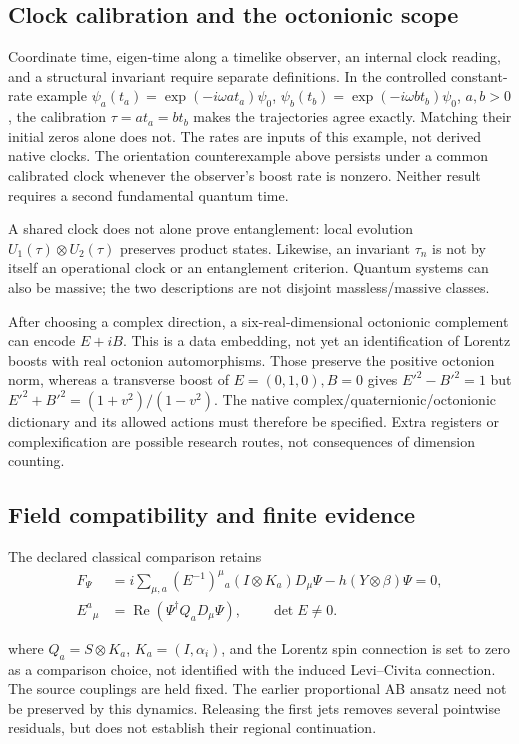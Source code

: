 \subsection{Clock calibration and the octonionic scope}
\label{subsec:v410-clock-scope}

Coordinate time, eigen-time along a timelike observer, an internal clock
reading, and a structural invariant require separate definitions. In the
controlled constant-rate example
\(\psi_a(t_a)=\exp(-i\omega a t_a)\psi_0\),
\(\psi_b(t_b)=\exp(-i\omega b t_b)\psi_0\), \(a,b>0\), the calibration
\(\tau=a t_a=b t_b\) makes the trajectories agree exactly. Matching
their initial zeros alone does not. The rates are inputs of this example,
not derived native clocks. The orientation counterexample above persists
under a common calibrated clock whenever the observer's boost rate is
nonzero. Neither result requires a second fundamental quantum time.

A shared clock does not alone prove entanglement: local evolution
\(U_1(\tau)\otimes U_2(\tau)\) preserves product states. Likewise, an
invariant \(\tau_n\) is not by itself an operational clock or an
entanglement criterion. Quantum systems can also be massive; the two
descriptions are not disjoint massless/massive classes.

After choosing a complex direction, a six-real-dimensional octonionic
complement can encode \(E+iB\). This is a data embedding, not yet an
identification of Lorentz boosts with real octonion automorphisms.
Those preserve the positive octonion norm, whereas a transverse boost of
\(E=(0,1,0),B=0\) gives
\(E'^2-B'^2=1\) but
\(E'^2+B'^2=(1+v^2)/(1-v^2)\).
The native complex/quaternionic/octonionic dictionary and its allowed
actions must therefore be specified. Extra registers or complexification
are possible research routes, not consequences of dimension counting.

\begin{samepage}
\subsection{Field compatibility and finite evidence}
\label{subsec:v410-field-compatibility}

The declared classical comparison retains
\[
 \begin{aligned}
 F_\Psi&=i\sum_{\mu,a}(E^{-1})^\mu{}_a(I\otimes K_a)D_\mu\Psi
             -h(Y\otimes\beta)\Psi=0,\\
 E^a{}_{\mu}&=\operatorname{Re}(\Psi^\dagger Q_aD_\mu\Psi),\qquad\det E\ne0.
 \end{aligned}
\]
\end{samepage}
where \(Q_a=S\otimes K_a\), \(K_a=(I,\alpha_i)\), and the Lorentz
spin connection is set to zero as a comparison choice, not identified
with the induced Levi--Civita connection. The source couplings are held
fixed. The earlier proportional AB ansatz need not be preserved by this
dynamics. Releasing the first jets removes several pointwise residuals,
but does not establish their regional continuation.

